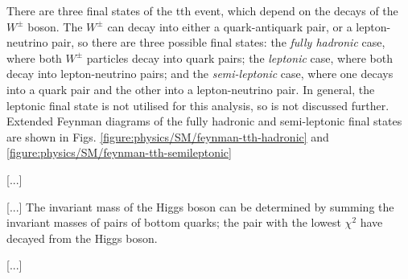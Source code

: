 There are three final states of the tth event, which depend on the decays of the $W^\pm$ boson. The $W^\pm$ can decay into either a quark-antiquark pair, or a lepton-neutrino pair, so there are three possible final states: the \emph{fully hadronic} case, where both $W^\pm$ particles decay into quark pairs; the \emph{leptonic} case, where both decay into lepton-neutrino pairs; and the \emph{semi-leptonic} case, where one decays into a quark pair and the other into a lepton-neutrino pair. In general, the leptonic final state is not utilised for this analysis, so is not discussed further. Extended Feynman diagrams of the fully hadronic and semi-leptonic final states are shown in Figs. \ref{figure:physics/SM/feynman-tth-hadronic} and \ref{figure:physics/SM/feynman-tth-semileptonic}

[...]

[...] The invariant mass of the Higgs boson can be determined by summing the invariant masses of pairs of bottom quarks; the pair with the lowest $\chi^2$ have decayed from the Higgs boson.

[...]

